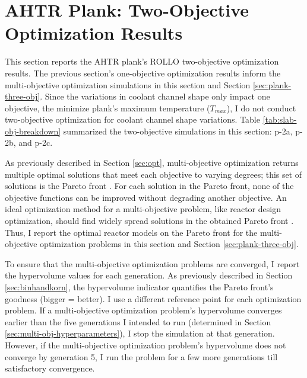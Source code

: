 \section{AHTR Plank: Two-Objective Optimization Results}
\label{sec:plank-two-obj}
This section reports the \gls{AHTR} plank's \gls{ROLLO} two-objective 
optimization results. 
The previous section's one-objective optimization results inform the multi-objective 
optimization simulations in this section and Section \ref{sec:plank-three-obj}.
Since the variations in coolant channel shape only impact one objective, 
the minimize plank's maximum temperature ($T_{max}$), I do not conduct two-objective 
optimization for coolant channel shape variations.  
Table \ref{tab:slab-obj-breakdown} summarized the two-objective simulations in this 
section: p-2a, p-2b, and p-2c.

As previously described in Section \ref{sec:opt}, multi-objective optimization returns 
multiple optimal solutions that meet each objective to varying degrees; this set of 
solutions is the Pareto front \cite{deb_multi-objective_2001}. 
For each solution in the Pareto front, none of the objective functions can be 
improved without degrading another objective.
An ideal optimization method for a multi-objective problem, like reactor design 
optimization, should find widely spread solutions in the obtained Pareto front 
\cite{deb_multi-objective_2001}. 
Thus, I report the optimal reactor models on the Pareto front for the multi-objective 
optimization problems in this section and Section \ref{sec:plank-three-obj}. 

To ensure that the multi-objective optimization problems are converged, I report the 
hypervolume values for each generation. 
As previously described in Section \ref{sec:binhandkorn}, the hypervolume indicator 
quantifies the Pareto front's goodness (bigger = better).
I use a different reference point for each optimization problem. 
If a multi-objective optimization problem's hypervolume converges earlier than the 
five generations I intended to run (determined in Section 
\ref{sec:multi-obj-hyperparameters}), I stop the simulation at that generation. 
However, if the multi-objective optimization problem's hypervolume does not converge by 
generation 5, I run the problem for a few more generations till satisfactory convergence.

